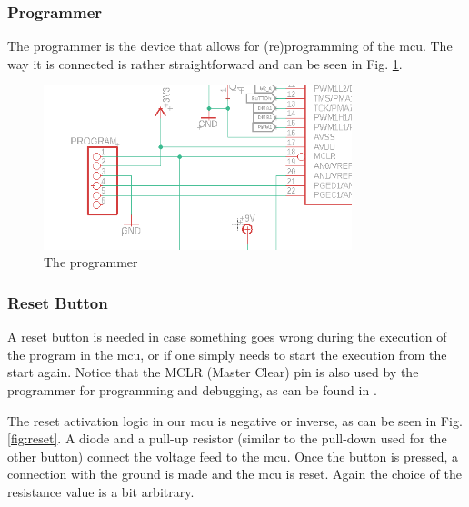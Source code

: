 \vspace{1cm}


\subsubsection{Programmer}

The programmer is the device that allows for (re)programming of the mcu. The way it is connected is rather straightforward and can be seen in Fig. \ref{fig:programmer}.

\begin{figure}[htb]
    \centering
    \includegraphics[width=0.8\textwidth]{figures/hardware/Programmer.PNG}
    \caption{The programmer}
    \label{fig:programmer}
\end{figure}

\FloatBarrier
\vspace{1cm}


\subsubsection{Reset Button}

A reset button is needed in case something goes wrong during the execution of the program in the mcu, or if one simply needs to start the execution from the start again. Notice that the MCLR (Master Clear) pin is also used by the programmer for programming and debugging, as can be found in \cite{mcu}.

The reset activation logic in our mcu is negative or inverse, as can be seen in Fig. \ref{fig:reset}. A diode and a pull-up resistor (similar to the pull-down used for the other button) connect the voltage feed to the mcu. Once the button is pressed, a connection with the ground is made and the mcu is reset.
Again the choice of the resistance value is a bit arbitrary.

